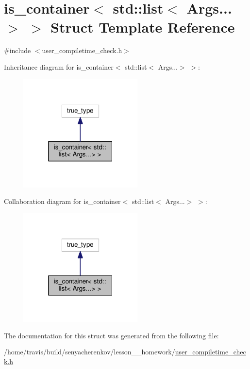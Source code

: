 \hypertarget{structis__container_3_01std_1_1list_3_01Args_8_8_8_4_01_4}{\section{is\-\_\-container$<$ std\-:\-:list$<$ Args...$>$ $>$ Struct Template Reference}
\label{structis__container_3_01std_1_1list_3_01Args_8_8_8_4_01_4}
}


{\ttfamily \#include $<$user\-\_\-compiletime\-\_\-check.\-h$>$}



Inheritance diagram for is\-\_\-container$<$ std\-:\-:list$<$ Args...$>$ $>$\-:
\nopagebreak
\begin{figure}[H]
\begin{center}
\leavevmode
\includegraphics[width=176pt]{structis__container_3_01std_1_1list_3_01Args_8_8_8_4_01_4__inherit__graph}
\end{center}
\end{figure}


Collaboration diagram for is\-\_\-container$<$ std\-:\-:list$<$ Args...$>$ $>$\-:
\nopagebreak
\begin{figure}[H]
\begin{center}
\leavevmode
\includegraphics[width=176pt]{structis__container_3_01std_1_1list_3_01Args_8_8_8_4_01_4__coll__graph}
\end{center}
\end{figure}


The documentation for this struct was generated from the following file\-:\begin{DoxyCompactItemize}
\item 
/home/travis/build/senyacherenkov/lesson\-\_\-\_\-homework/\hyperlink{user__compiletime__check_8h}{user\-\_\-compiletime\-\_\-check.\-h}\end{DoxyCompactItemize}
